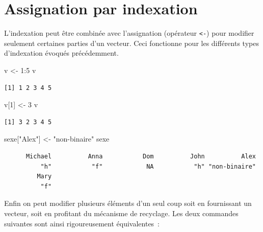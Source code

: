 \documentclass[
  letterpaper,
  DIV=11,
  numbers=noendperiod,
  oneside]{scrreprt}
\newenvironment{Shaded}{\begin{snugshade}}{\end{snugshade}}
\newcommand{\DecValTok}[1]{\textcolor[rgb]{0.68,0.00,0.00}{#1}}
\newcommand{\NormalTok}[1]{\textcolor[rgb]{0.00,0.23,0.31}{#1}}
\newcommand{\OtherTok}[1]{\textcolor[rgb]{0.00,0.23,0.31}{#1}}
\newcommand{\SpecialCharTok}[1]{\textcolor[rgb]{0.37,0.37,0.37}{#1}}
\newcommand{\StringTok}[1]{\textcolor[rgb]{0.13,0.47,0.30}{#1}}
\begin{document}
\hypertarget{assignation-par-indexation}{%
\section{Assignation par indexation}\label{assignation-par-indexation}}

L'indexation peut être combinée avec l'assignation (opérateur
\texttt{\textless{}-}) pour modifier seulement certaines parties d'un
vecteur. Ceci fonctionne pour les différents types d'indexation évoqués
précédemment.

\begin{Shaded}
\begin{Highlighting}[]
\NormalTok{v }\OtherTok{\textless{}{-}} \DecValTok{1}\SpecialCharTok{:}\DecValTok{5}
\NormalTok{v}
\end{Highlighting}
\end{Shaded}

\begin{verbatim}
[1] 1 2 3 4 5
\end{verbatim}

\begin{Shaded}
\begin{Highlighting}[]
\NormalTok{v[}\DecValTok{1}\NormalTok{] }\OtherTok{\textless{}{-}} \DecValTok{3}
\NormalTok{v}
\end{Highlighting}
\end{Shaded}

\begin{verbatim}
[1] 3 2 3 4 5
\end{verbatim}

\begin{Shaded}
\begin{Highlighting}[]
\NormalTok{sexe[}\StringTok{"Alex"}\NormalTok{] }\OtherTok{\textless{}{-}} \StringTok{"non{-}binaire"}
\NormalTok{sexe}
\end{Highlighting}
\end{Shaded}

\begin{verbatim}
      Michael          Anna           Dom          John          Alex 
          "h"           "f"            NA           "h" "non-binaire" 
         Mary 
          "f" 
\end{verbatim}

Enfin on peut modifier plusieurs éléments d'un seul coup soit en
fournissant un vecteur, soit en profitant du mécanisme de recyclage. Les
deux commandes suivantes sont ainsi rigoureusement équivalentes~:
\end{document}
